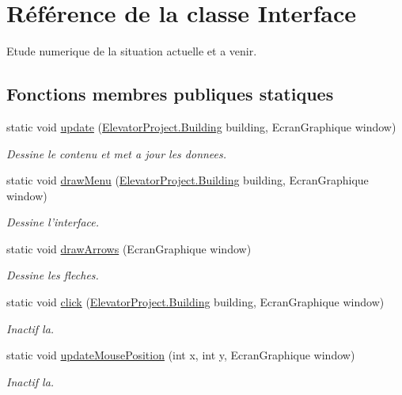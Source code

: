 \hypertarget{classInterface}{\section{Référence de la classe Interface}
\label{classInterface}
}


Etude numerique de la situation actuelle et a venir.  


\subsection*{Fonctions membres publiques statiques}
\begin{DoxyCompactItemize}
\item 
static void \hyperlink{classInterface_a677a3ad3d9bdd58a23226ad53ca02376}{update} (\hyperlink{classElevatorProject_1_1Building}{Elevator\-Project.\-Building} building, Ecran\-Graphique window)
\begin{DoxyCompactList}\small\item\em Dessine le contenu et met a jour les donnees. \end{DoxyCompactList}\item 
static void \hyperlink{classInterface_ae3547e96f0058b202e740b6d11583770}{draw\-Menu} (\hyperlink{classElevatorProject_1_1Building}{Elevator\-Project.\-Building} building, Ecran\-Graphique window)
\begin{DoxyCompactList}\small\item\em Dessine l'interface. \end{DoxyCompactList}\item 
static void \hyperlink{classInterface_a44dbe03690eb3452be7ab9fc60a71db8}{draw\-Arrows} (Ecran\-Graphique window)
\begin{DoxyCompactList}\small\item\em Dessine les fleches. \end{DoxyCompactList}\item 
static void \hyperlink{classInterface_a78506981f663c67a4aba25d66b2cac76}{click} (\hyperlink{classElevatorProject_1_1Building}{Elevator\-Project.\-Building} building, Ecran\-Graphique window)
\begin{DoxyCompactList}\small\item\em Inactif la. \end{DoxyCompactList}\item 
static void \hyperlink{classInterface_a91d479c45ee621860bcf91fe3a721f41}{update\-Mouse\-Position} (int x, int y, Ecran\-Graphique window)
\begin{DoxyCompactList}\small\item\em Inactif la. \end{DoxyCompactList}\end{DoxyCompactItemize}



